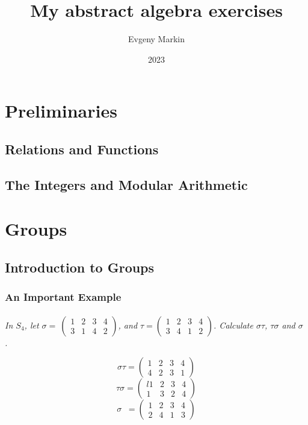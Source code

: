 \documentclass[11pt,oneside,titlepage]{book}
\title{My abstract algebra exercises}
\author{Evgeny Markin}
\date{2023}
\DeclareMathOperator \inv {^{-1}}
\begin{document}
\maketitle
\tableofcontents

\part{Preliminaries}

\chapter{Relations and Functions}

\chapter{The Integers and Modular Arithmetic}

\part{Groups}

\chapter{Introduction to Groups}

\section{An Important Example}

\subsection{}

\textit{In $S_4$, let $\sigma = \
  \begin{pmatrix}
    1 & 2 & 3 & 4 \\
    3 & 1 & 4 & 2
  \end{pmatrix}
  $,
  and $\tau =
  \begin{pmatrix}
    1 & 2 & 3 & 4 \\
    3 & 4 & 1 & 2
  \end{pmatrix}
  $. Calculate $\sigma \tau$, $\tau \sigma$ and $\sigma \inv$.
}

$$\sigma \tau =
\begin{pmatrix}
  1 & 2 & 3 & 4\\
  4 & 2 & 3 & 1 
\end{pmatrix}
$$
$$ \tau \sigma =
\begin{pmatrix}
l  1 & 2 & 3 & 4\\
  1 & 3 & 2 & 4 
\end{pmatrix}
$$
$$\sigma \inv =
\begin{pmatrix}
  1 & 2 & 3 & 4 \\
  2 & 4 & 1 & 3
\end{pmatrix}
$$
\end{document}
